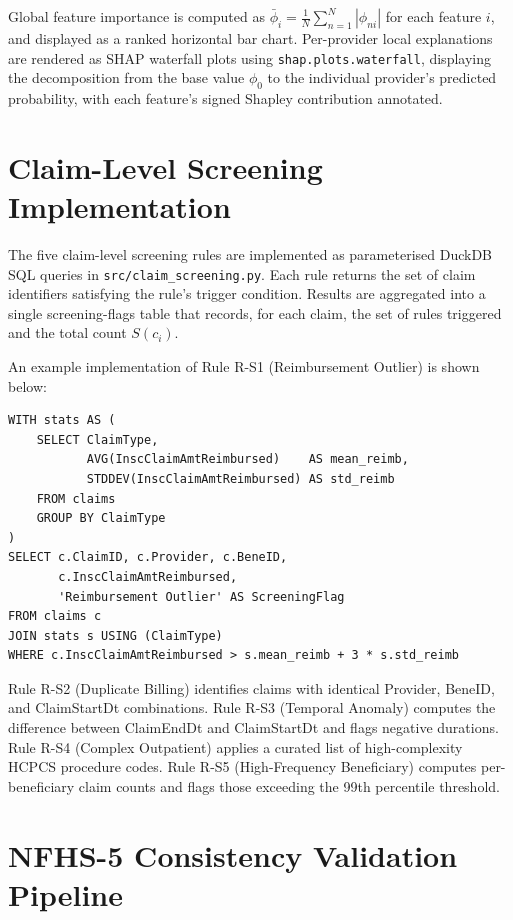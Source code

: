 Global feature importance is computed as $\bar{\phi}_i = \frac{1}{N} \sum_{n=1}^{N} |\phi_{ni}|$ for each feature $i$, and displayed as a ranked horizontal bar chart. Per-provider local explanations are rendered as SHAP waterfall plots using \texttt{shap.plots.waterfall}, displaying the decomposition from the base value $\phi_0$ to the individual provider's predicted probability, with each feature's signed Shapley contribution annotated.

\section{Claim-Level Screening Implementation}
\label{sec:impl-screening}

The five claim-level screening rules are implemented as parameterised DuckDB SQL queries in \texttt{src/claim\_screening.py}. Each rule returns the set of claim identifiers satisfying the rule's trigger condition. Results are aggregated into a single screening-flags table that records, for each claim, the set of rules triggered and the total count $S(c_i)$.

An example implementation of Rule R-S1 (Reimbursement Outlier) is shown below:

\begin{lstlisting}
WITH stats AS (
    SELECT ClaimType,
           AVG(InscClaimAmtReimbursed)    AS mean_reimb,
           STDDEV(InscClaimAmtReimbursed) AS std_reimb
    FROM claims
    GROUP BY ClaimType
)
SELECT c.ClaimID, c.Provider, c.BeneID,
       c.InscClaimAmtReimbursed,
       'Reimbursement Outlier' AS ScreeningFlag
FROM claims c
JOIN stats s USING (ClaimType)
WHERE c.InscClaimAmtReimbursed > s.mean_reimb + 3 * s.std_reimb
\end{lstlisting}

Rule R-S2 (Duplicate Billing) identifies claims with identical Provider, BeneID, and ClaimStartDt combinations. Rule R-S3 (Temporal Anomaly) computes the difference between ClaimEndDt and ClaimStartDt and flags negative durations. Rule R-S4 (Complex Outpatient) applies a curated list of high-complexity HCPCS procedure codes. Rule R-S5 (High-Frequency Beneficiary) computes per-beneficiary claim counts and flags those exceeding the 99th percentile threshold.

\section{NFHS-5 Consistency Validation Pipeline}
\label{sec:impl-nfhs}

